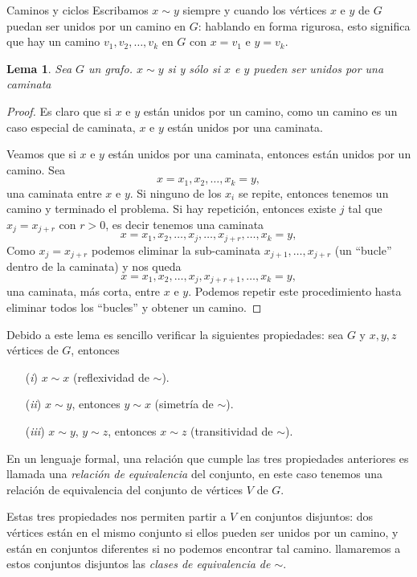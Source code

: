 \documentclass[11pt,spanish,makeidx]{amsbook}
\newtheorem{lema}[teorema]{Lema}
\theoremstyle{definition}
\theoremstyle{remark}
\begin{document}
\begin{section}{Caminos y ciclos}
Escribamos $x \sim y$ siempre y cuando los vértices $x$ e $y$ de $G$ puedan ser unidos por un camino en $G$: hablando en forma rigurosa, esto significa que hay un camino $v_1,v_2,\ldots,v_k$ en $G$ con $x=v_1$ e $y=v_k$. 

\begin{lema} Sea $G$ un grafo. $x \sim y$ si  y sólo si $x$ e $y$ pueden ser unidos por una caminata 
\end{lema}
\begin{proof}Es claro que si $x$ e $y$ están unidos por un camino, como  un camino es un caso especial de caminata, $x$ e $y$ están unidos por una caminata.

Veamos que si  $x$ e $y$ están unidos por una caminata, entonces están unidos por un camino. Sea 
$$
x=x_1,x_2,\ldots,x_k=y,
$$
una caminata entre  $x$ e $y$. Si ninguno de los $x_i$ se repite, entonces tenemos un camino y terminado el problema. Si hay repetición, entonces existe $j$ tal que $x_j = x_{j+r}$ con $r >0$, es decir tenemos una caminata
$$
x=x_1,x_2,\ldots,x_j,\ldots,x_{j+r},\ldots, x_k=y,
$$
Como $x_j = x_{j+r}$ podemos eliminar la sub-caminata $x_{j+1},\ldots,x_{j+r}$ (un ``bucle'' dentro de la caminata) y nos queda 
$$
x=x_1,x_2,\ldots,x_j,x_{j+r+1},\ldots, x_k=y,
$$
una caminata, más corta,  entre $x$ e $y$. Podemos repetir este procedimiento hasta eliminar todos los ``bucles'' y obtener un camino.
\end{proof}

Debido a este lema es sencillo verificar la siguientes propiedades: sea $G$ y $x,y,z$ vértices de $G$, entonces
\begin{enumerate}
\item[({\em i})] $x \sim x$ (reflexividad de $\sim$).
\item[({\em ii})] $x \sim y$, entonces $y \sim x$ (simetría de $\sim$).
\item[({\em iii})]  $x \sim y$,  $y \sim z$, entonces  $x \sim z$ (transitividad  de $\sim$).
\end{enumerate}

En un lenguaje formal, una relación que  cumple las tres propiedades anteriores es llamada una  {\em relación de equivalencia} del conjunto, en este caso tenemos una relación de equivalencia del conjunto de vértices $V$ de $G$. 

Estas tres propiedades nos permiten partir a $V$ en conjuntos disjuntos: dos vértices están en el mismo conjunto si ellos pueden ser unidos por un camino, y están en conjuntos diferentes si no podemos encontrar tal camino. llamaremos a estos conjuntos disjuntos las {\em clases de equivalencia de $\sim$}.


\end{section}
\end{document}
